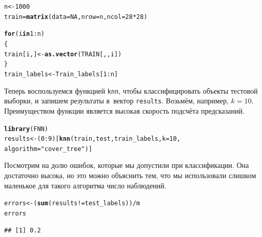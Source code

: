 \documentclass[final,pdftex]{../../template/epsilonj}\usepackage[]{graphicx}\usepackage[]{color}
\makeatletter
\newcommand{\hlnum}[1]{\textcolor[rgb]{0.686,0.059,0.569}{#1}}%
\newcommand{\hlstr}[1]{\textcolor[rgb]{0.192,0.494,0.8}{#1}}%
\newcommand{\hlopt}[1]{\textcolor[rgb]{0,0,0}{#1}}%
\newcommand{\hlstd}[1]{\textcolor[rgb]{0.345,0.345,0.345}{#1}}%
\newcommand{\hlkwa}[1]{\textcolor[rgb]{0.161,0.373,0.58}{\textbf{#1}}}%
\newcommand{\hlkwb}[1]{\textcolor[rgb]{0.69,0.353,0.396}{#1}}%
\newcommand{\hlkwc}[1]{\textcolor[rgb]{0.333,0.667,0.333}{#1}}%
\newcommand{\hlkwd}[1]{\textcolor[rgb]{0.737,0.353,0.396}{\textbf{#1}}}%
\newenvironment{kframe}{%
 \def\at@end@of@kframe{}%
 \ifinner\ifhmode%
  \def\at@end@of@kframe{\end{minipage}}%
  \begin{minipage}{\columnwidth}%
 \fi\fi%
 \def\FrameCommand##1{\hskip\@totalleftmargin \hskip-\fboxsep
 \colorbox{shadecolor}{##1}\hskip-\fboxsep
     \hskip-\linewidth \hskip-\@totalleftmargin \hskip\columnwidth}%
 \MakeFramed {\advance\hsize-\width
   \@totalleftmargin\z@ \linewidth\hsize
   \@setminipage}}%
 {\par\unskip\endMakeFramed%
 \at@end@of@kframe}
\newenvironment{knitrout}{}{} %
\makeatother
\begin{document}
\begin{knitrout}
\color{fgcolor}\begin{kframe}
\begin{alltt}
\hlstd{n} \hlkwb{<-} \hlnum{1000}
\hlstd{train} \hlkwb{=} \hlkwd{matrix}\hlstd{(}\hlkwc{data} \hlstd{=} \hlnum{NA}\hlstd{,} \hlkwc{nrow} \hlstd{= n,} \hlkwc{ncol} \hlstd{=} \hlnum{28}\hlopt{*}\hlnum{28} \hlstd{)}

\hlkwa{for} \hlstd{(i} \hlkwa{in} \hlnum{1}\hlopt{:}\hlstd{n)}
  \hlstd{\{}
\hlstd{train[i,]} \hlkwb{<-} \hlkwd{as.vector}\hlstd{(TRAIN[,,i])}
  \hlstd{\}}
\hlstd{train_labels} \hlkwb{<-} \hlstd{Train_labels[}\hlnum{1}\hlopt{:}\hlstd{n]}
\end{alltt}
\end{kframe}
\end{knitrout}



Теперь воспользуемся функцией \texttt{knn}, чтобы классифицировать объекты тестовой выборки, и запишем результаты в~вектор \texttt{results}. Возьмём, например, $k=10$. 
Преимуществом функции является высокая скорость подсчёта предсказаний.

\begin{knitrout}
\color{fgcolor}\begin{kframe}
\begin{alltt}
\hlkwd{library}\hlstd{(FNN)}
\hlstd{results} \hlkwb{<-} \hlstd{(}\hlnum{0}\hlopt{:}\hlnum{9}\hlstd{)[}\hlkwd{knn}\hlstd{(train, test, train_labels,} \hlkwc{k} \hlstd{=} \hlnum{10}\hlstd{,}
                     \hlkwc{algorithm} \hlstd{=} \hlstr{"cover_tree"}\hlstd{)]}
\end{alltt}
\end{kframe}
\end{knitrout}

Посмотрим на долю ошибок, которые мы допустили при классификации. 
Она достаточно высока, но это можно объяснить тем, что мы использовали слишком маленькое для такого алгоритма число наблюдений.

\begin{knitrout}
\color{fgcolor}\begin{kframe}
\begin{alltt}
\hlstd{errors} \hlkwb{<-} \hlstd{(}\hlkwd{sum}\hlstd{(results} \hlopt{!=} \hlstd{test_labels))}\hlopt{/}\hlstd{m}
\hlstd{errors}
\end{alltt}
\begin{verbatim}
## [1] 0.2
\end{verbatim}
\end{kframe}
\end{knitrout}
\end{document}
